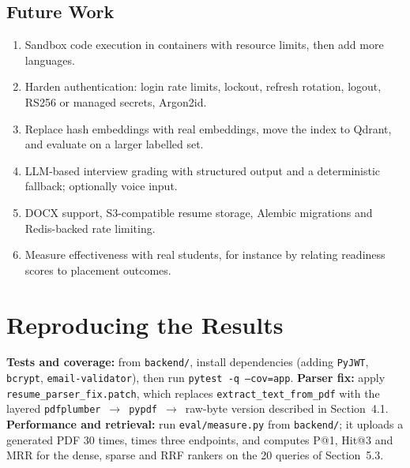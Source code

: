 \documentclass[openany]{tietreport}
\newcommand{\code}[1]{\texttt{\small #1}}
\begin{document}
\section{Future Work}
\begin{enumerate}
  \item Sandbox code execution in containers with resource limits, then add more languages.
  \item Harden authentication: login rate limits, lockout, refresh rotation, logout, RS256 or managed secrets, Argon2id.
  \item Replace hash embeddings with real embeddings, move the index to Qdrant, and evaluate on a larger labelled set.
  \item LLM-based interview grading with structured output and a deterministic fallback; optionally voice input.
  \item DOCX support, S3-compatible resume storage, Alembic migrations and Redis-backed rate limiting.
  \item Measure effectiveness with real students, for instance by relating readiness scores to placement outcomes.
\end{enumerate}

\printbibliography[heading=bibintoc,title={Bibliography}]

\appendix
\chapter{Reproducing the Results}
\textbf{Tests and coverage:} from \code{backend/}, install dependencies (adding \code{PyJWT}, \code{bcrypt}, \code{email-validator}), then run \code{pytest -q --cov=app}. \textbf{Parser fix:} apply \code{resume\_parser\_fix.patch}, which replaces \code{extract\_text\_from\_pdf} with the layered \code{pdfplumber}~$\rightarrow$~\code{pypdf}~$\rightarrow$~raw-byte version described in Section~4.1. \textbf{Performance and retrieval:} run \code{eval/measure.py} from \code{backend/}; it uploads a generated PDF 30 times, times three endpoints, and computes P@1, Hit@3 and MRR for the dense, sparse and RRF rankers on the 20 queries of Section~5.3.
\end{document}
